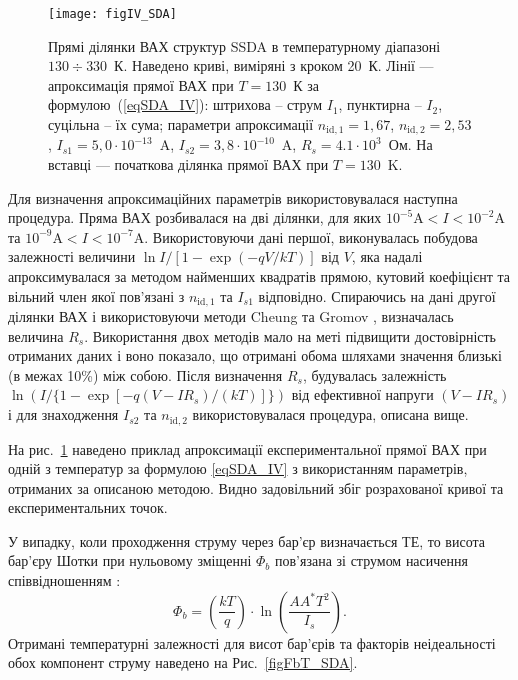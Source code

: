\begin{figure}
\center
\texttt{[image: figIV\_SDA]}
\caption{\label{figIV_SDA}
Прямі  ділянки ВАХ структур SSDA в температурному діапазоні $130\div330$~К.
Наведено криві, виміряні з кроком 20~К.
Лінії --- апроксимація прямої ВАХ при $T=130$~К за формулою~(\ref{eqSDA_IV}):
штрихова -- струм $I_1$, пунктирна -- $I_2$,
суцільна -- їх сума;
параметри апроксимації $n_{\mathrm{id},1}=1,67$,
$n_{\mathrm{id},2}=2,53$,
$I_{s1}=5,0\cdot10^{-13}$~A,
$I_{s2}=3,8\cdot10^{-10}$~A, $R_{s}=4.1\cdot10^3$~Ом.
На вставці --- початкова ділянка прямої ВАХ при $T=130$~K.
}%
\end{figure}

Для визначення апроксимаційних параметрів використовувалася наступна процедура.
Пряма ВАХ розбивалася на дві ділянки,
для яких $10^{-5}\mbox{A}<I<10^{-2}\mbox{A}$ та
$10^{-9}\mbox{A}<I<10^{-7}\mbox{A}$.
Використовуючи дані першої, виконувалась побудова залежності величини $\ln{{I}/{\left[1-\exp\left(-qV/kT\right)\right]}}$ від $V$, яка надалі
апроксимувалася за методом найменших квадратів прямою,
кутовий коефіцієнт та вільний член якої пов'язані з $n_{\mathrm{id},1}$ та $I_{s1}$ відповідно.
Спираючись на дані другої ділянки ВАХ і використовуючи методи Cheung \cite{Cheung} та Gromov \cite{Gromov}, визначалась величина $R_s$.
Використання двох методів мало на меті підвищити достовірність отриманих даних і воно показало, що отримані обома шляхами значення близькі (в межах 10\%) між собою.
Після визначення $R_s$, будувалась залежність $\ln (I /\{1 - \exp[ -q (V - IR_s) / (kT ) ]\})$ від
ефективної напруги $(V-IR_s)$ і для знаходження $I_{s2}$ та $n_{\mathrm{id},2}$ використовувалася процедура, описана вище.

На рис.~\ref{figIV_SDA} наведено приклад апроксимації експериментальної прямої ВАХ при одній з температур за формулою \eqref{eqSDA_IV} з використанням параметрів,
отриманих за описаною методою.
Видно задовільний збіг розрахованої кривої та експериментальних точок.

У випадку, коли проходження струму через бар'єр визначається ТЕ, то висота бар'єру Шотки при
нульовому зміщенні $\Phi_b$ пов'язана зі струмом насичення співвідношенням \cite{Rhoderick1988}:
\begin{equation}
\label{eqFb:TE}
\Phi_b=\left(\frac{kT}{q}\right)\cdot\ln\left(\frac{AA^*T^2}{I_s}\right).
\end{equation}
Отримані температурні залежності для висот бар'єрів та факторів неідеальності обох компонент струму наведено на Рис.~\ref{figFbT_SDA}.

